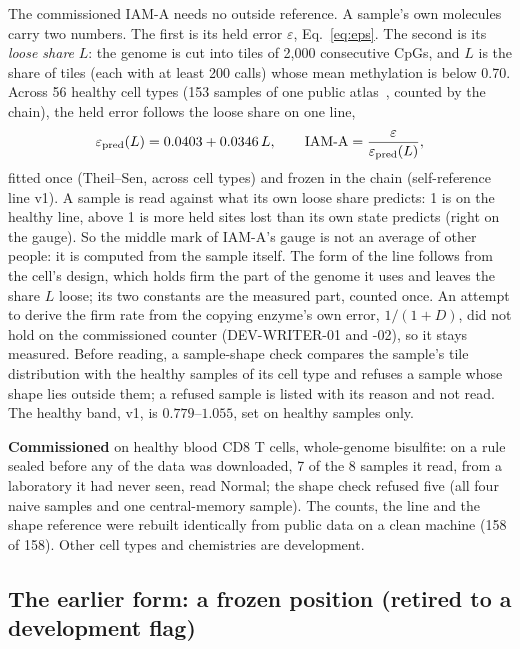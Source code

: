 The commissioned IAM-A needs no outside reference. A sample's own molecules carry two numbers. The first is its held error
$\varepsilon$, Eq.~\eqref{eq:eps}. The second is its \emph{loose share} $L$: the genome is cut into tiles of 2,000 consecutive CpGs,
and $L$ is the share of tiles (each with at least 200 calls) whose mean methylation is below 0.70. Across 56 healthy cell types
(153 samples of one public atlas~\cite{Loyfer2023}, counted by the chain), the held error follows the loose share on one line,
\begin{equation}
  \varepsilon_{\rm pred}(L)=0.0403+0.0346\,L,\qquad
  \text{IAM-A}=\frac{\varepsilon}{\varepsilon_{\rm pred}(L)},
  \label{eq:iama}
\end{equation}
fitted once (Theil--Sen, across cell types) and frozen in the chain (self-reference line v1). \measured{} A sample is read against what its
own loose share predicts: 1 is on the healthy line, above 1 is more held sites lost than its own state predicts (right on the gauge). So the middle mark of IAM-A's gauge is not an average of other people: it is computed from the sample itself. The form of the line follows from the cell's design, which holds firm the part of the genome it uses and leaves the share $L$ loose; its two constants are the measured part, counted once. An attempt to derive the firm rate from the copying enzyme's own error, $1/(1+D)$, did not hold on the commissioned counter (DEV-WRITER-01 and -02), so it stays measured. \measured{}
Before reading, a sample-shape check compares the sample's tile distribution with the healthy samples of its cell type and refuses
a sample whose shape lies outside them; a refused sample is listed with its reason and not read. The healthy band, v1, is
$0.779$--$1.055$, set on healthy samples only.

\textbf{Commissioned} on healthy blood CD8 T cells, whole-genome bisulfite: on a rule sealed before any of the data was
downloaded, 7 of the 8 samples it read, from a laboratory it had never seen, read Normal; the shape check refused five (all four naive
samples and one central-memory sample). The counts, the line and the shape reference were rebuilt identically from public data on a clean
machine (158 of 158). Other cell types and chemistries are development.

\subsection*{The earlier form: a frozen position (retired to a development flag)}

